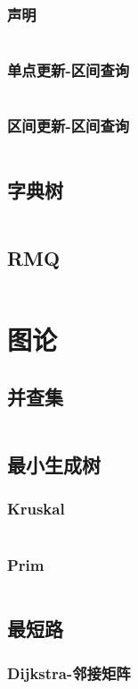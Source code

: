     \subsubsection{声明}
      \inputminted{cpp}{src/4_数据结构/2_线段树/1_声明.cpp}
    \subsubsection{单点更新-区间查询}
      \inputminted{cpp}{src/4_数据结构/2_线段树/2_单点更新-区间查询.cpp}
    \subsubsection{区间更新-区间查询}
      \inputminted{cpp}{src/4_数据结构/2_线段树/3_区间更新-区间查询.cpp}
  \subsection{字典树}
    \inputminted{cpp}{src/4_数据结构/3_字典树.cpp}
  \subsection{RMQ}
    \inputminted{cpp}{src/4_数据结构/4_RMQ.cpp}
\section{图论}
  \subsection{并查集}
    \inputminted{cpp}{src/5_图论/1_并查集.cpp}
  \subsection{最小生成树}
    \subsubsection{Kruskal}
      \inputminted{cpp}{src/5_图论/2_最小生成树/1_Kruskal.cpp}
    \subsubsection{Prim}
      \inputminted{cpp}{src/5_图论/2_最小生成树/2_Prim.cpp}
  \subsection{最短路}
    \subsubsection{Dijkstra-邻接矩阵}
      \inputminted{cpp}{src/5_图论/3_最短路/1_Dijkstra-邻接矩阵.cpp}
